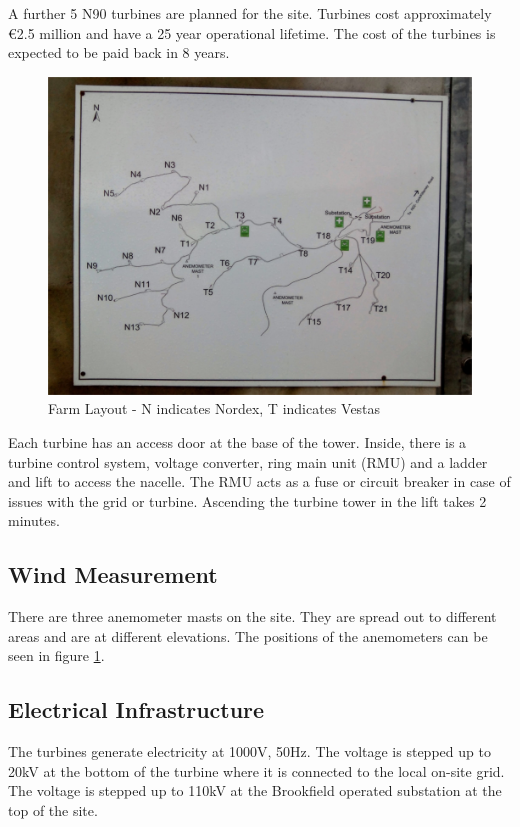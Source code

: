\documentclass[12pt]{article} %
\begin{document}
A further 5 N90 turbines are planned for the site. Turbines cost approximately \euro2.5 million and have a 25 year operational lifetime. The cost of the turbines is expected to be paid back in 8 years.
\begin{figure}[h]
	\begin{center}
	  \includegraphics[width=1\textwidth]{kilgarvan_layout}
	\end{center}
	\caption{Farm Layout - N indicates Nordex, T indicates Vestas}
  \label{fig:sitemap}
\end{figure}

Each turbine has an access door at the base of the tower. Inside, there is a turbine control system, voltage converter, ring main unit (RMU) and a ladder and lift to access the nacelle. The RMU acts as a fuse or circuit breaker in case of issues with the grid or turbine. Ascending the turbine tower in the lift takes 2 minutes.

\subsection{Wind Measurement}
There are three anemometer masts on the site. They are spread out to different areas and are at different elevations. The positions of the anemometers can be seen in figure \ref{fig:sitemap}.

\subsection{Electrical Infrastructure}
The turbines generate electricity at 1000V, 50Hz. The voltage is stepped up to 20kV at the bottom of the turbine where it is connected to the local on-site grid. The voltage is stepped up to 110kV at the Brookfield operated substation at the top of the site.
\end{document}
